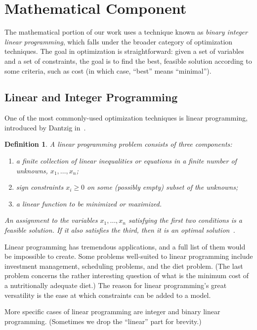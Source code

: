 \documentclass{article}
\newtheorem{defi}[thm]{Definition}
\begin{document}
\section{Mathematical Component}\label{sec:math}

The mathematical portion of our work uses a technique known as \emph{binary integer linear programming}, which falls under the broader category of
optimization techniques. The goal in optimization is straightforward: given a set of variables and a set of constraints, the goal is to find the best,
feasible solution according to some criteria, such as cost (in which case, ``best'' means ``minimal'').

\subsection{Linear and Integer Programming}

One of the most commonly-used optimization techniques is linear programming, introduced by Dantzig in~\cite{GVK180926950}.

\begin{defi}\label{defi:linear_programming}
A \emph{linear programming problem} consists of three components: 
\begin{enumerate}
    \item a finite collection of linear inequalities or equations in a finite number of unknowns, $x_1, \ldots, x_n$;
    \item sign constraints $x_i \ge 0$ on some (possibly empty) subset of the unknowns;
    \item a linear function to be minimized or maximized.
\end{enumerate}
An assignment to the variables $x_1, \ldots, x_n$ satisfying the first two conditions is a \emph{feasible} solution. If it also satisfies the third,
then it is an \emph{optimal} solution~\cite{opac-b1105716}.
\end{defi}

Linear programming has tremendous applications, and a full list of them would be impossible to create. Some problems well-suited to linear programming
include investment management, scheduling problems, and the diet problem. (The last problem concerns the rather interesting question of what is the
minimum cost of a nutritionally adequate diet.) The reason for linear programming's great versatility is the ease at which constraints can be added to
a model.

More specific cases of linear programming are integer and binary linear programming. (Sometimes we drop the ``linear'' part for brevity.)
\end{document}
